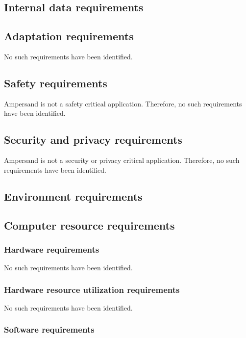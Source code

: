 \subsection{Internal data requirements}

\subsection{Adaptation requirements}
No such requirements have been identified.

\subsection{Safety requirements}
Ampersand is not a safety critical application.
Therefore, no such requirements have been identified.

\subsection{Security and privacy requirements}
Ampersand is not a security or privacy critical application.
Therefore, no such requirements have been identified.

\subsection{Environment requirements}

\subsection{Computer resource requirements}
	\subsubsection{Hardware requirements}
	No such requirements have been identified.

	\subsubsection{Hardware resource utilization requirements}
	No such requirements have been identified.

	\subsubsection{Software requirements}
	\\
		
